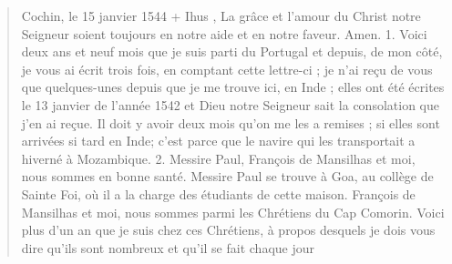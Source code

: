 \begin{quote}
Cochin, le 15 janvier 1544
+
Ihus ,
La grâce et l'amour du Christ notre Seigneur soient toujours en
notre aide et en notre faveur. Amen.
1. Voici deux ans et neuf mois que je suis parti du Portugal et
depuis, de mon côté, je vous ai écrit trois fois, en comptant cette
lettre-ci ; je n'ai reçu de vous que quelques-unes depuis que je me
trouve ici, en Inde ; elles ont été écrites le 13 janvier de l'année
1542 et Dieu notre Seigneur sait la consolation que j'en ai reçue.
Il doit y avoir deux mois qu'on me les a remises ; si elles sont arrivées
si tard en Inde; c'est parce que le navire qui les transportait
a hiverné à Mozambique.
2. Messire Paul, François de Mansilhas et moi, nous sommes en
bonne santé. Messire Paul se trouve à Goa, au collège de Sainte
Foi, où il a la charge des étudiants de cette maison. François de
Mansilhas et moi, nous sommes parmi les Chrétiens du Cap Comorin.
Voici plus d'un an que je suis chez ces Chrétiens, à propos desquels
je dois vous dire qu'ils sont nombreux et qu'il se fait chaque jour

\end{quote}

